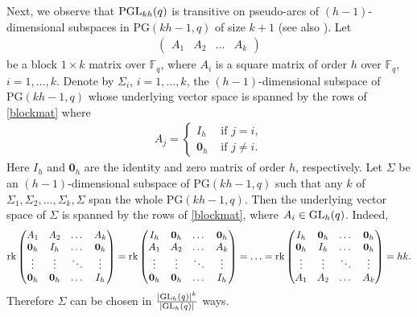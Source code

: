 \documentclass[11pt]{article}
\theoremstyle{definition}
\numberwithin{equation}{section}
\def\0{\mathbf 0}
\def\PG{\mathrm{PG}}
\def\F{{\mathbb F}}
\def\PGL{{\rm PGL}}
\def\GL{{\rm GL}}
\def\rk{{\rm rk}}
\begin{document}
Next, we observe that $\PGL_{kh}(q)$ is transitive on pseudo-arcs of $(h-1)$-dimensional subspaces in $\PG(kh-1,q)$ of size $k+1$ (see also \cite[Theorem 1.6]{Thas1971}). Let 
\begin{align}
\begin{pmatrix}
A_1 & A_2 & \dots & A_k 
\end{pmatrix} \label{blockmat}
\end{align}
be a block $1 \times k$ matrix over $\F_q$, where $A_i$ is a square matrix of order $h$ over $\F_q$, $i = 1, \dots, k$. Denote by $\Sigma_i$, $i = 1, \dots, k$, the $(h-1)$-dimensional subspace of $\PG(kh-1, q)$ whose underlying vector space is spanned by the rows of \eqref{blockmat} where 
\begin{align*}
A_j = 
\begin{cases}
I_h & \mbox{ if } j = i, \\
\0_h & \mbox{ if } j \ne i.
\end{cases}
\end{align*}
Here $I_h$ and $\0_h$ are the identity and zero matrix of order $h$, respectively. Let $\Sigma$ be an $(h-1)$-dimensional subspace of $\PG(kh-1, q)$ such that any $k$ of $\Sigma_1, \Sigma_2, \dots, \Sigma_k, \Sigma$ span the whole $\PG(kh-1, q)$. Then the underlying vector space of $\Sigma$ is spanned by the rows of \eqref{blockmat}, where $A_i \in \GL_h(q)$. Indeed, 
\begin{align*}
\rk \begin{pmatrix} 
A_1 & A_2 & \dots & A_k  \\
\0_h & I_h & \dots & \0_h \\
\vdots & \vdots & \ddots & \vdots \\
\0_h & \0_h & \dots & I_h 
\end{pmatrix} = 
\rk \begin{pmatrix} 
I_h & \0_h & \dots & \0_h \\
A_1 & A_2 & \dots & A_k  \\
\vdots & \vdots & \ddots & \vdots \\
\0_h & \0_h & \dots & I_h 
\end{pmatrix} = \ldots = 
\rk \begin{pmatrix} 
I_h & \0_h & \dots & \0_h \\
\0_h & I_h & \dots & \0_h \\
\vdots & \vdots & \ddots & \vdots \\
A_1 & A_2 & \dots & A_k 
\end{pmatrix} = hk.
\end{align*}
Therefore $\Sigma$ can be chosen in 
$
\frac{|\GL_h(q)|^k}{|\GL_h(q)|}
$
ways. 
\end{document}
